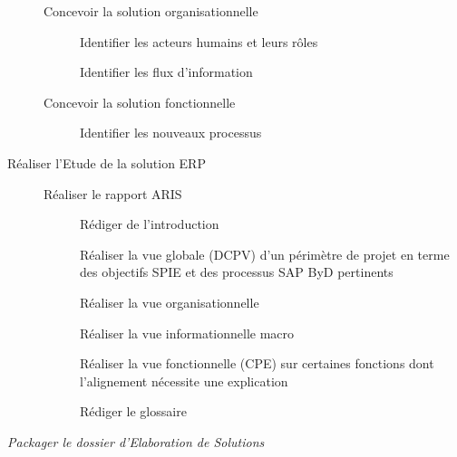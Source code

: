 \begin{description}
\begin{description}
\begin{description}
\begin{description}
                    \item[\textbullet] Concevoir la solution organisationnelle
                        \begin{description}
                            \item[\textbullet] Identifier les acteurs humains et leurs rôles
                            \item[\textbullet] Identifier les flux d'information
                        \end{description}
                    \item[\textbullet] Concevoir la solution fonctionnelle
                        \begin{description}
                            \item[\textbullet] Identifier les nouveaux processus
                        \end{description}
                \end{description}
                    \item[\textbullet] Réaliser l'Etude de la solution ERP
                        \begin{description}
                    \item[\textbullet] Réaliser le rapport ARIS
                        \begin{description}
                            \item[\textbullet] Rédiger de l'introduction
                            \item[\textbullet] Réaliser la vue globale (DCPV) d'un périmètre de projet en terme des objectifs SPIE et des processus SAP ByD pertinents
                            \item[\textbullet] Réaliser la vue organisationnelle 
                            \item[\textbullet] Réaliser la vue informationnelle macro
                            \item[\textbullet] Réaliser la vue fonctionnelle (CPE) sur certaines fonctions dont l'alignement nécessite une explication
                            \item[\textbullet] Rédiger le glossaire 
                        \end{description}
                \end{description}
                \end{description}
            \item[\textbullet] \it{Packager le dossier d'Elaboration de Solutions}

\end{description}
\end{description}
